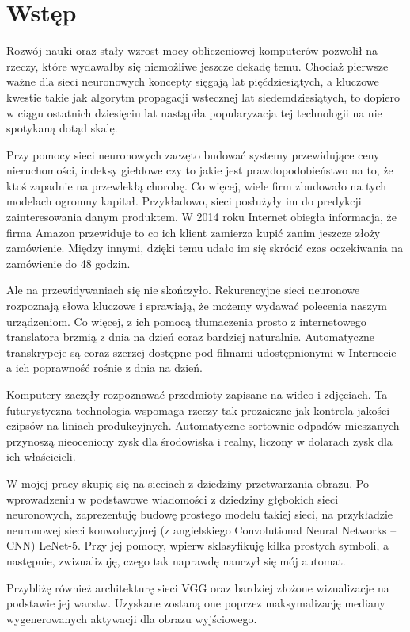 \chapter{Wstęp}
\label{cha:wstep}

Rozwój nauki oraz stały wzrost mocy obliczeniowej komputerów pozwolił na rzeczy, które wydawałby się niemożliwe jeszcze dekadę temu. Chociaż pierwsze ważne dla sieci neuronowych koncepty sięgają lat pięćdziesiątych, a kluczowe kwestie takie jak algorytm propagacji wstecznej lat siedemdziesiątych, to dopiero w ciągu ostatnich dziesięciu lat nastąpiła popularyzacja tej technologii na nie spotykaną dotąd skalę.

Przy pomocy sieci neuronowych zaczęto budować systemy przewidujące ceny nieruchomości, indeksy giełdowe czy to jakie jest prawdopodobieństwo na to, że ktoś zapadnie na przewlekłą chorobę. Co więcej, wiele firm zbudowało na tych modelach ogromny kapitał. Przykładowo, sieci posłużyły im do predykcji zainteresowania danym produktem. W 2014 roku Internet obiegła informacja, że firma Amazon przewiduje to co ich klient zamierza kupić zanim jeszcze złoży zamówienie. Między innymi, dzięki temu udało im się skrócić czas oczekiwania na zamówienie do 48 godzin.

Ale na przewidywaniach się nie skończyło. Rekurencyjne sieci neuronowe rozpoznają słowa kluczowe i sprawiają, że możemy wydawać polecenia naszym urządzeniom. Co więcej, z ich pomocą tłumaczenia prosto z internetowego translatora brzmią z dnia na dzień coraz bardziej naturalnie. Automatyczne transkrypcje są coraz szerzej dostępne pod filmami udostępnionymi w Internecie a ich poprawność rośnie z dnia na dzień.

Komputery zaczęły rozpoznawać przedmioty zapisane na wideo i zdjęciach.  Ta futurystyczna technologia wspomaga rzeczy tak prozaiczne jak kontrola jakości czipsów na liniach produkcyjnych. Automatyczne sortownie odpadów mieszanych przynoszą nieoceniony zysk dla środowiska i realny, liczony w dolarach zysk dla ich właścicieli. 

W mojej pracy skupię się na sieciach z dziedziny przetwarzania obrazu. Po wprowadzeniu w podstawowe wiadomości z dziedziny głębokich sieci neuronowych, zaprezentuję budowę prostego modelu takiej sieci, na przykładzie neuronowej sieci konwolucyjnej (z angielskiego Convolutional Neural Networks – CNN) LeNet-5. 
Przy jej pomocy, wpierw sklasyfikuję kilka prostych symboli, a następnie, zwizualizuję, czego tak naprawdę nauczył się mój automat.

Przybliżę również architekturę sieci VGG oraz bardziej złożone wizualizacje na podstawie jej warstw. Uzyskane zostaną one poprzez maksymalizację mediany wygenerowanych aktywacji dla obrazu wyjściowego.

